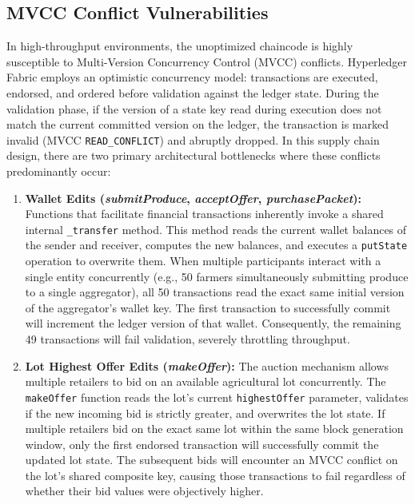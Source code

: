 \documentclass[12pt]{article}
\begin{document}
\subsection{MVCC Conflict Vulnerabilities}

In high-throughput environments, the unoptimized chaincode is highly susceptible to Multi-Version Concurrency Control (MVCC) conflicts. Hyperledger Fabric employs an optimistic concurrency model: transactions are executed, endorsed, and ordered before validation against the ledger state. During the validation phase, if the version of a state key read during execution does not match the current committed version on the ledger, the transaction is marked invalid (MVCC \texttt{READ\_CONFLICT}) and abruptly dropped. In this supply chain design, there are two primary architectural bottlenecks where these conflicts predominantly occur:

\begin{enumerate}
    \item \textbf{Wallet Edits (\textit{submitProduce}, \textit{acceptOffer}, \textit{purchasePacket}):} Functions that facilitate financial transactions inherently invoke a shared internal \texttt{\_transfer} method. This method reads the current wallet balances of the sender and receiver, computes the new balances, and executes a \texttt{putState} operation to overwrite them. When multiple participants interact with a single entity concurrently (e.g., 50 farmers simultaneously submitting produce to a single aggregator), all 50 transactions read the exact same initial version of the aggregator's wallet key. The first transaction to successfully commit will increment the ledger version of that wallet. Consequently, the remaining 49 transactions will fail validation, severely throttling throughput.
    
    \item \textbf{Lot Highest Offer Edits (\textit{makeOffer}):} The auction mechanism allows multiple retailers to bid on an available agricultural lot concurrently. The \texttt{makeOffer} function reads the lot's current \texttt{highestOffer} parameter, validates if the new incoming bid is strictly greater, and overwrites the lot state. If multiple retailers bid on the exact same lot within the same block generation window, only the first endorsed transaction will successfully commit the updated lot state. The subsequent bids will encounter an MVCC conflict on the lot's shared composite key, causing those transactions to fail regardless of whether their bid values were objectively higher.
\end{enumerate}
\end{document}
